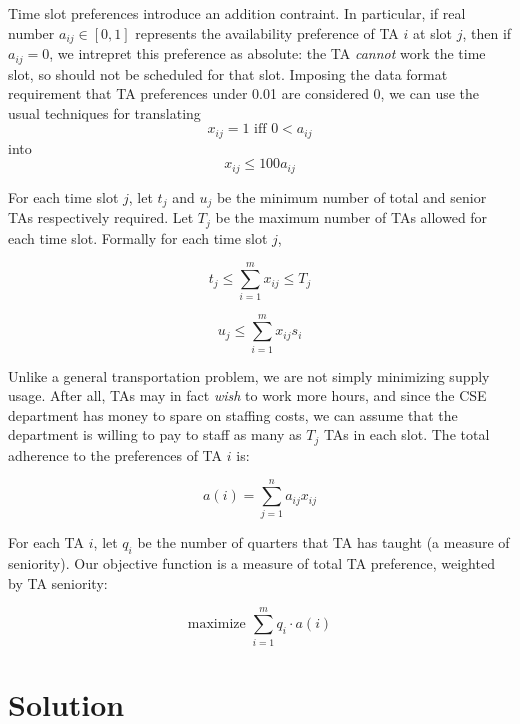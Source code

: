\documentclass{article}
\begin{document}
\begin{multicols}{2}
Time slot preferences introduce an addition contraint. In particular, if real number $a_{ij} \in [0,1]$ represents the availability preference of TA $i$ at slot $j$, then if $a_{ij} = 0$, we intrepret this preference as absolute: the TA \textit{cannot} work the time slot, so should not be scheduled for that slot. Imposing the data format requirement that TA preferences under 0.01 are considered 0, we can use the usual techniques for translating
\begin{equation}
x_{ij} = 1 \textrm{ iff } 0 < a_{ij}
\end{equation}
into
\begin{equation}
x_{ij} \leq 100 a_{ij}
\end{equation}

For each time slot $j$, let $t_j$ and $u_j$ be the minimum number of total and senior TAs respectively required. Let $T_j$ be the maximum number of TAs allowed for each time slot. Formally for each time slot $j$,

\begin{equation}
t_j \leq \sum_{i=1}^{m}x_{ij} \leq T_j
\end{equation}

\begin{equation}
u_j \leq \sum_{i=1}^{m}x_{ij}s_i
\end{equation}

Unlike a general transportation problem, we are not simply minimizing supply usage. After all, TAs may in fact \textit{wish} to work more hours, and since the CSE department has money to spare on staffing costs, we can assume that the department is willing to pay to staff as many as $T_j$ TAs in each slot. The total adherence to the preferences of TA $i$ is:

\begin{equation}
a(i) = \sum_{j=1}^na_{ij}x_{ij}
\end{equation}

For each TA $i$, let $q_i$ be the number of quarters that TA has taught (a measure of seniority). Our objective function is a measure of total TA preference, weighted by TA seniority:

\begin{equation}
\textrm{maximize } \sum_{i=1}^mq_i\cdot a(i)
\end{equation}

\section*{Solution}


\end{multicols}
\end{document}

